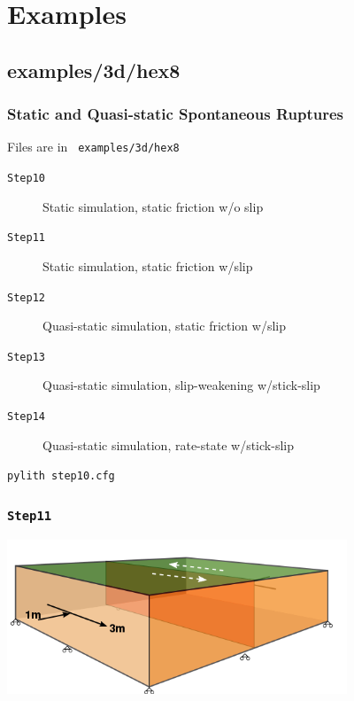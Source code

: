 \documentclass{beamer}
\begin{document}
\section{Examples}
\subsection{examples/3d/hex8}

\begin{frame}
  \frametitle{Static and Quasi-static Spontaneous Ruptures}
  
  \vfill
  Files are in {\tt\color{red} examples/3d/hex8}
  \vfill

  \begin{description}
  \item[{\tt Step10}] Static simulation, static friction w/o slip
  \item[{\tt Step11}] Static simulation, static friction w/slip
  \item[{\tt Step12}] Quasi-static simulation, static friction w/slip
  \item[{\tt Step13}] Quasi-static simulation, slip-weakening w/stick-slip
  \item[{\tt Step14}] Quasi-static simulation, rate-state w/stick-slip
  \end{description}
  
  \vfill
  {\tt pylith step10.cfg}
  \vfill

\end{frame}


\begin{frame}
  \frametitle{{\tt Step11}}

  \begin{center}
    \includegraphics[width=4.0in]{figs/step11_schematic}
  \end{center}
  
\end{frame}
\end{document}

